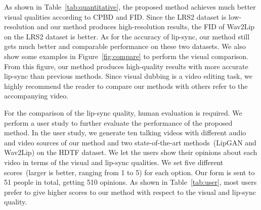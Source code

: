 


As shown in Table~\ref{tab:quantitative}, the proposed method achieves much better visual qualities according to CPBD and FID. Since the LRS2 dataset is low-resolution and our method produces high-resolution results, the FID of Wav2Lip on the LRS2 dataset is better. As for the accuracy of lip-sync, our method still gets much better and comparable performance on these two datasets. We also show some examples in Figure~\ref{fig:compare} to perform the visual comparison. From this figure, our method produces high-quality results with more accurate lip-sync than previous methods. Since visual dubbing is a video editing task, we highly recommend the reader to compare our methods with others refer to the accompanying video.

For the comparison of the lip-sync quality, human evaluation is required. We perform a user study to further evaluate the performance of the proposed method. In the user study, we generate ten talking videos with different audio and video sources of our method and two state-of-the-art methods~(LipGAN and Wav2Lip) on the HDTF dataset. We let the users show their opinions about each video in terms of the visual and lip-sync qualities. We set five different scores~(larger is better, ranging from 1 to 5) for each option. Our form is sent to 51 people in total, getting 510 opinions. As shown in Table~\ref{tab:user}, most users prefer to give higher scores to our method with respect to the visual and lip-sync quality.


